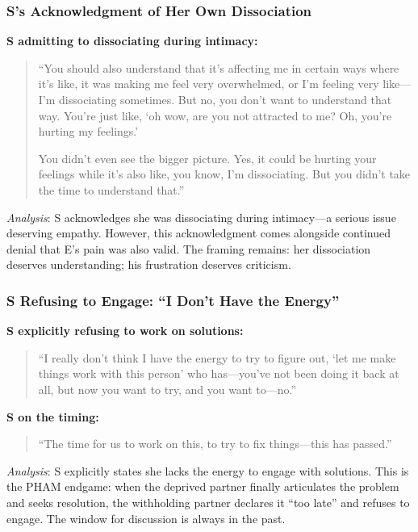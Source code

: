 \documentclass[12pt, letterpaper]{article}
\begin{document}
\subsubsection{S's Acknowledgment of Her Own Dissociation}

\textbf{S admitting to dissociating during intimacy:}
\begin{quote}
``You should also understand that it's affecting me in certain ways where it's like, it was making me feel very overwhelmed, or I'm feeling very like---I'm dissociating sometimes. But no, you don't want to understand that way. You're just like, `oh wow, are you not attracted to me? Oh, you're hurting my feelings.'

You didn't even see the bigger picture. Yes, it could be hurting your feelings while it's also like, you know, I'm dissociating. But you didn't take the time to understand that.''
\end{quote}

\textit{Analysis}: S acknowledges she was dissociating during intimacy---a serious issue deserving empathy. However, this acknowledgment comes alongside continued denial that E's pain was also valid. The framing remains: her dissociation deserves understanding; his frustration deserves criticism.

\subsubsection{S Refusing to Engage: ``I Don't Have the Energy''}

\textbf{S explicitly refusing to work on solutions:}
\begin{quote}
``I really don't think I have the energy to try to figure out, `let me make things work with this person' who has---you've not been doing it back at all, but now you want to try, and you want to---no.''
\end{quote}

\textbf{S on the timing:}
\begin{quote}
``The time for us to work on this, to try to fix things---this has passed.''
\end{quote}

\textit{Analysis}: S explicitly states she lacks the energy to engage with solutions. This is the PHAM endgame: when the deprived partner finally articulates the problem and seeks resolution, the withholding partner declares it ``too late'' and refuses to engage. The window for discussion is always in the past.
\end{document}
